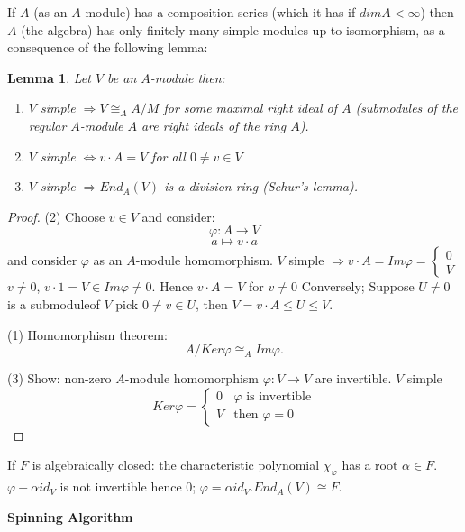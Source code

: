 \documentclass[12pt]{amsart}
\newtheorem{lemma}[theorem]{Lemma}
\theoremstyle{definition}
\begin{document}
If $A$ (as an $A$-module) has a composition series (which it has if $dimA < \infty$) then $A$ (the algebra) has only finitely many simple modules up to isomorphism, as a consequence of the following lemma:
\begin{lemma} \label{schur}
\label{simple}
Let $V$ be an $A$-module then:
\begin{enumerate}
\item $V$ simple $\Rightarrow V \cong_{A} A / M$ for some maximal right ideal of $A$ (submodules of the regular $A$-module $A$ are right ideals of the ring $A$).
\item $V$ simple $\Leftrightarrow v \cdot A = V$ for all $0 \neq v \in V$
\item $V$ simple $\Rightarrow End_{A} (V)$ is a division ring (Schur's lemma).
\end{enumerate}
\end{lemma}

 \begin{proof}
(2) Choose $v \in V$ and consider: $$\varphi: A \rightarrow V$$ $$a \mapsto v \cdot a$$
and consider $\varphi$ as an $A$-module homomorphism. $V$ simple $\Rightarrow v \cdot A = Im \varphi = \begin{cases}
0\\
V
\end{cases}$
$v \neq 0$, $v \cdot 1 = V \in Im \varphi \neq 0$. Hence $v \cdot A = V$ for $v \neq 0$
Conversely; Suppose $U \neq 0$ is a submoduleof $V$ pick $0 \neq v \in U$, then $V = v \cdot A \leq U \leq V$.

(1) Homomorphism theorem: $$A / Ker \varphi \cong_{A} Im \varphi.$$

(3) Show: non-zero $A$-module homomorphism $\varphi: V \rightarrow V$ are invertible. $V$ simple $$Ker \varphi = \begin{cases}
0 & \varphi \mbox{ is invertible}\\
V & \mbox{then }\varphi = 0
\end{cases}$$
\end{proof}

If $F$ is algebraically closed: the characteristic polynomial $\chi_{\varphi}$ has a root $\alpha \in F$. $\varphi-\alpha id_{V}$ is not invertible hence 0; $\varphi = \alpha id_{V}. End_{A} (V) \cong F$.

\begin{center}
\textbf{Spinning Algorithm}
\end{center}
\end{document}
